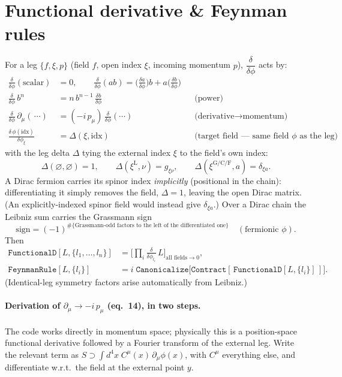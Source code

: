 \documentclass[11pt]{article}
\newcommand{\g}{g}
\newcommand{\code}[1]{\texttt{#1}}
\begin{document}
\section{Functional derivative \& Feynman rules}
For a leg $\{f,\xi,p\}$ (field $f$, open index $\xi$, incoming momentum $p$),
$\dfrac{\delta}{\delta\phi}$ acts by:
\begin{align}
\frac{\delta}{\delta\phi}(\text{scalar}) &= 0, \qquad
\frac{\delta}{\delta\phi}(ab) = \Big(\tfrac{\delta a}{\delta\phi}\Big)b + a\Big(\tfrac{\delta b}{\delta\phi}\Big) \\
\frac{\delta}{\delta\phi}\,b^{n} &= n\,b^{n-1}\,\frac{\delta b}{\delta\phi} &&\text{(power)}\\
\frac{\delta}{\delta\phi}\,\partial_\mu(\,\cdots) &= (-i\,p_\mu)\,\frac{\delta}{\delta\phi}(\cdots) &&\text{(derivative}\to\text{momentum)}\\
\frac{\delta\,\phi(\text{idx})}{\delta\phi_\xi} &= \Delta(\xi,\text{idx}) &&\text{(target field --- same field $\phi$ as the leg)}
\end{align}
with the leg delta $\Delta$ tying the external index $\xi$ to the field's own index:
\begin{equation}
\Delta(\varnothing,\varnothing)=1,\qquad
\Delta(\xi^{\mathrm{L}},\nu)=\g_{\xi\nu},\qquad
\Delta(\xi^{\mathrm{G/C/F}},a)=\delta_{\xi a}.
\end{equation}
A Dirac fermion carries its spinor index \emph{implicitly} (positional in the
chain): differentiating it simply removes the field, $\Delta=1$, leaving the
open Dirac matrix. (An explicitly-indexed spinor field would instead give
$\delta_{\xi a}$.)
Over a Dirac chain the Leibniz sum carries the Grassmann sign
\begin{equation}
\text{sign} = (-1)^{\#\{\text{Grassmann-odd factors to the left of the differentiated one}\}}\quad(\text{fermionic }\phi).
\end{equation}
Then
\begin{align}
\code{FunctionalD}[L,\{l_1,\dots,l_n\}] &= \Big[\textstyle\prod_i \tfrac{\delta}{\delta\phi_{l_i}}\,L\Big]_{\text{all fields}\to 0},\\
\code{FeynmanRule}[L,\{l_i\}] &= i\;\code{Canonicalize}\!\big[\code{Contract}[\,\code{FunctionalD}[L,\{l_i\}]\,]\big].
\end{align}
(Identical-leg symmetry factors arise automatically from Leibniz.)

\paragraph{Derivation of $\partial_\mu\to-i\,p_\mu$ (eq.~14), in two steps.}
The code works directly in momentum space; physically this is a position-space
functional derivative followed by a Fourier transform of the external leg.
Write the relevant term as $S\supset\int d^4x\;C^\mu(x)\,\partial_\mu\phi(x)$,
with $C^\mu$ everything else, and differentiate w.r.t.\ the field at the
external point $y$.
\end{document}

